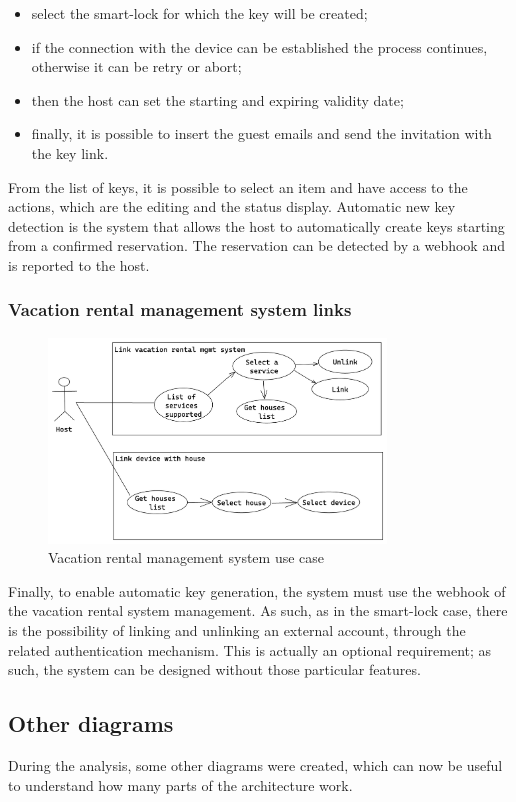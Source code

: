 \begin{itemize}
    \item select the smart-lock for which the key will be created;
    \item if the connection with the device can be established the process continues, otherwise it can be retry or abort;
    \item then the host can set the starting and expiring validity date;
    \item finally, it is possible to insert the guest emails and send the invitation with the key link. 
\end{itemize}
From the list of keys, it is possible to select an item and have access to the actions, which are the editing and the status display.
Automatic new key detection is the system that allows the host to automatically create keys starting from a confirmed reservation. The reservation can be detected by a webhook and is reported to the host.

\subsubsection{Vacation rental management system links}
\begin{figure}[H]
    \centering
    \includegraphics[width=0.8\textwidth]{figures/vrms.excalidraw.png}
    \caption{Vacation rental management system use case}
    \label{fig:vrmsusecase}
\end{figure}
Finally, to enable automatic key generation, the system must use the webhook of the vacation rental system management. As such, as in the smart-lock case, there is the possibility of linking and unlinking an external account, through the related authentication mechanism. This is actually an optional requirement; as such, the system can be designed without those particular features.

\subsection{Other diagrams}
During the analysis, some other diagrams were created, which can now be useful to understand how many parts of the architecture work.
